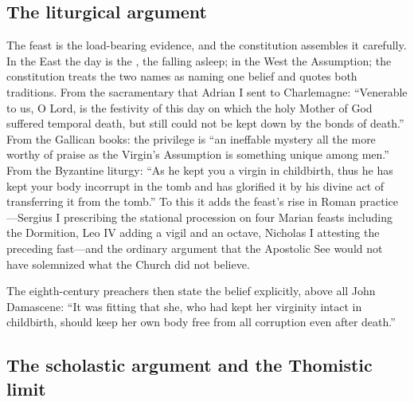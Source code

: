 \subsection*{The liturgical argument}

The feast is the load-bearing evidence, and the constitution assembles it
carefully. In the East the day is the , the falling
asleep; in the West the Assumption; the constitution treats the two names
as naming one belief and quotes both traditions. From the sacramentary
that Adrian I sent to Charlemagne: ``Venerable to us, O Lord, is the
festivity of this day on which the holy Mother of God suffered temporal
death, but still could not be kept down by the bonds of death.'' From the
Gallican books: the privilege is ``an ineffable mystery all the more
worthy of praise as the Virgin's Assumption is something unique among
men.'' From the Byzantine liturgy: ``As he kept you a virgin in
childbirth, thus he has kept your body incorrupt in the tomb and has
glorified it by his divine act of transferring it from the
tomb.'' To this it adds the feast's rise
in Roman practice---Sergius I prescribing the stational procession on
four Marian feasts including the Dormition, Leo IV adding a vigil and an
octave, Nicholas I attesting the preceding fast---and the ordinary
argument that the Apostolic See would not have solemnized what the
Church did not believe.

The eighth-century preachers then state the belief explicitly, above all
John Damascene: ``It was fitting that she, who had kept her virginity
intact in childbirth, should keep her own body free from all corruption
even after death.''

\subsection*{The scholastic argument and the Thomistic limit}

